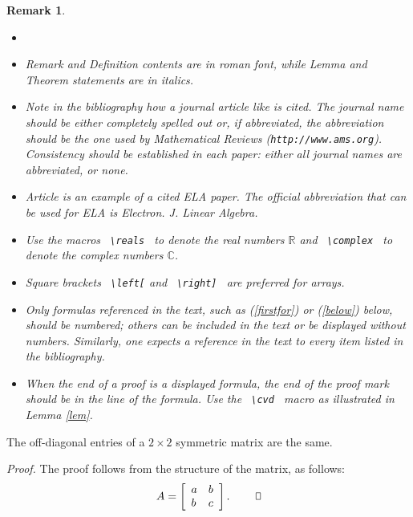 \documentclass[10pt,twoside]{siamart1116}
\def\cvd{~\vbox{\hrule\hbox{%
     \vrule height1.3ex\hskip0.8ex\vrule}\hrule } }
\newtheorem{remark}[theorem]{Remark}
\newcommand{\reals}{\mathbb{R}}
\newcommand{\complex}{\mathbb{C}}
\begin{document}
\begin{remark}
 
\begin{itemize}
\item[]
\item
Remark and Definition contents are in roman font, while
Lemma and Theorem statements are in italics.
\item
Note in the bibliography how a journal article like \cite{schneider-84}
is cited.  The journal name should be either completely spelled out or,
if abbreviated, the abbreviation should be the one used by 
{\em Mathematical Reviews} ({\tt http://www.ams.org}).
Consistency should be established in each paper: either all journal 
names are abbreviated, or none.
\item
Article \cite{ela-paper} is an example of a cited ELA paper.
The official abbreviation that can be used for ELA is
{\em Electron. J. Linear Algebra}.
\item
Use the macros {\verb# \reals #} to denote the real numbers $\reals$ and 
{\verb# \complex #} to denote the complex numbers $\complex$.
\item
Square brackets {\verb# \left[#} and {\verb# \right] #} are preferred for arrays.
\item
Only formulas referenced in the text, such as 
(\ref{firstfor}) or (\ref{below}) below, should be numbered; 
others can be included in the text or be displayed without numbers. 
Similarly, one expects a reference 
in the text to every item listed in the bibliography.
\item
When the end of a proof is a displayed formula, the end of the proof
mark should be in the line of the formula. Use the {\verb# \cvd #}
macro as illustrated in Lemma \ref{lem}.
\end{itemize}
\end{remark}

\begin{lemma}
\label{lem}
The off-diagonal entries of a $2 \times 2$ symmetric matrix 
are the same.
\end{lemma}

{\em Proof.}  
The proof follows from the structure of the matrix, as follows:
\begin{equation}
\label{below}
A =  \left[ \begin{array}{lr} a  & b \\ b &  c  \end{array}
\right]. ~~~~~~ \cvd
\end{equation}
\end{document}
